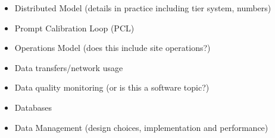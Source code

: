 \documentclass [draft,notitlepage] {article}
\begin{document}
\begin{itemize}

\item Distributed Model (details in practice including tier system, numbers)

\item Prompt Calibration Loop (PCL)

\item Operations Model (does this include site operations?)


\item Data transfers/network usage


\item Data quality monitoring (or is this a software topic?)

\item Databases


\item Data Management (design choices, implementation and performance)


\end{itemize}
\end{document}
